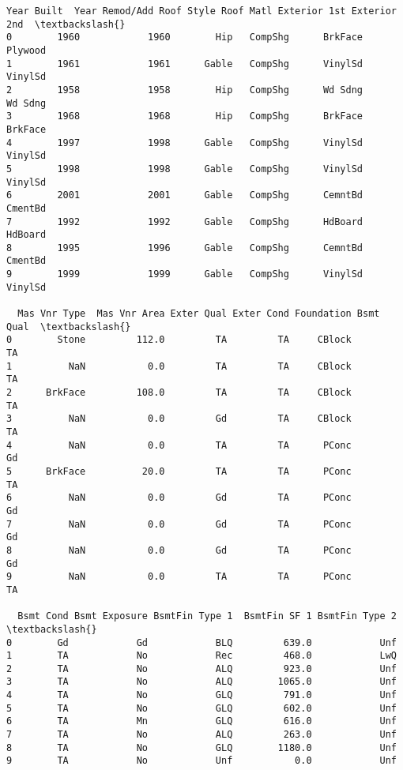 \documentclass[11pt]{article}
\begin{document}
\begin{tcolorbox}[breakable, size=fbox, boxrule=.5pt, pad at break*=1mm, opacityfill=0]
\begin{Verbatim}[commandchars=\\\{\}]
   Year Built  Year Remod/Add Roof Style Roof Matl Exterior 1st Exterior 2nd  \textbackslash{}
0        1960            1960        Hip   CompShg      BrkFace      Plywood
1        1961            1961      Gable   CompShg      VinylSd      VinylSd
2        1958            1958        Hip   CompShg      Wd Sdng      Wd Sdng
3        1968            1968        Hip   CompShg      BrkFace      BrkFace
4        1997            1998      Gable   CompShg      VinylSd      VinylSd
5        1998            1998      Gable   CompShg      VinylSd      VinylSd
6        2001            2001      Gable   CompShg      CemntBd      CmentBd
7        1992            1992      Gable   CompShg      HdBoard      HdBoard
8        1995            1996      Gable   CompShg      CemntBd      CmentBd
9        1999            1999      Gable   CompShg      VinylSd      VinylSd

  Mas Vnr Type  Mas Vnr Area Exter Qual Exter Cond Foundation Bsmt Qual  \textbackslash{}
0        Stone         112.0         TA         TA     CBlock        TA
1          NaN           0.0         TA         TA     CBlock        TA
2      BrkFace         108.0         TA         TA     CBlock        TA
3          NaN           0.0         Gd         TA     CBlock        TA
4          NaN           0.0         TA         TA      PConc        Gd
5      BrkFace          20.0         TA         TA      PConc        TA
6          NaN           0.0         Gd         TA      PConc        Gd
7          NaN           0.0         Gd         TA      PConc        Gd
8          NaN           0.0         Gd         TA      PConc        Gd
9          NaN           0.0         TA         TA      PConc        TA

  Bsmt Cond Bsmt Exposure BsmtFin Type 1  BsmtFin SF 1 BsmtFin Type 2  \textbackslash{}
0        Gd            Gd            BLQ         639.0            Unf
1        TA            No            Rec         468.0            LwQ
2        TA            No            ALQ         923.0            Unf
3        TA            No            ALQ        1065.0            Unf
4        TA            No            GLQ         791.0            Unf
5        TA            No            GLQ         602.0            Unf
6        TA            Mn            GLQ         616.0            Unf
7        TA            No            ALQ         263.0            Unf
8        TA            No            GLQ        1180.0            Unf
9        TA            No            Unf           0.0            Unf


\end{Verbatim}
\end{tcolorbox}
\end{document}
